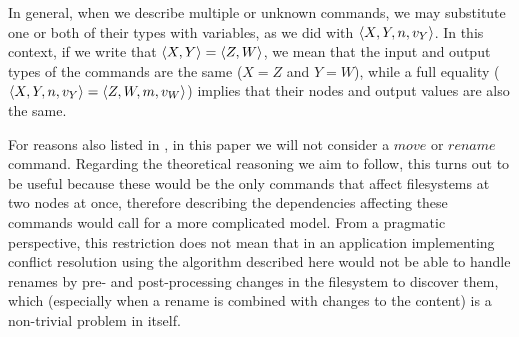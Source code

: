 In general, when we describe multiple or unknown commands, we may substitute one or both
of their types with variables, as we did with $\langle{X,Y,n,v_Y}\rangle$. In this context,
if we write that $\langle{X,Y}\rangle=\langle{Z,W}\rangle$, we mean that the input and output types
of the commands are the same ($X=Z$ and $Y=W$), while a full equality 
($\langle{X,Y,n,v_Y}\rangle=\langle{Z,W,m,v_W}\rangle$)
implies
that their nodes and output values are also the same.

\medskip


For reasons also listed in \cite{NREC}, in this paper we will not consider
a $move$ or $rename$ command. Regarding the theoretical reasoning we aim to follow,
this turns out to be useful because these would be the only commands that affect
filesystems at two nodes at once, therefore describing 
the dependencies affecting these commands
would call for a more complicated model.
From a pragmatic perspective, this restriction does not mean that in an application
implementing conflict resolution using the algorithm described here would not be
able to handle renames by pre- and post-processing changes in the filesystem to
discover them, which (especially when a rename is combined with changes to the content)
is a non-trivial problem in itself.
